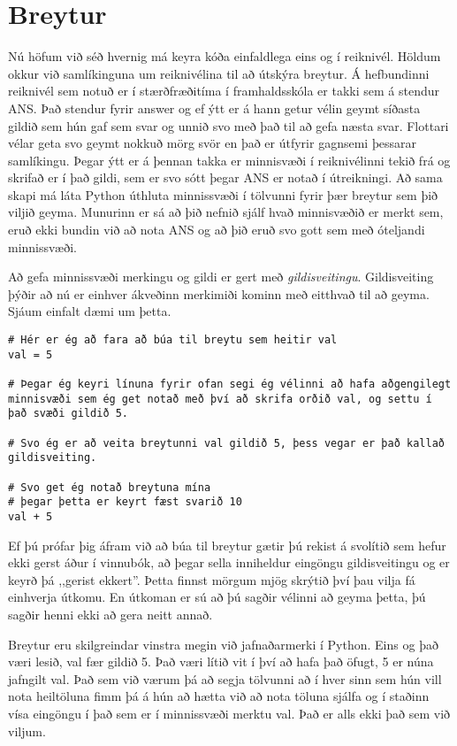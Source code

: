 \section{Breytur}
Nú höfum við séð hvernig má keyra kóða einfaldlega eins og í reiknivél.
Höldum okkur við samlíkinguna um reiknivélina til að útskýra breytur.
Á hefbundinni reiknivél sem notuð er í stærðfræðitíma í framhaldsskóla er takki sem á stendur ANS.
Það stendur fyrir answer og ef ýtt er á hann getur vélin geymt síðasta gildið sem hún gaf sem svar og unnið svo með það til að gefa næsta svar.
Flottari vélar geta svo geymt nokkuð mörg svör en það er útfyrir gagnsemi þessarar samlíkingu.
Þegar ýtt er á þennan takka er minnisvæði í reiknivélinni tekið frá og skrifað er í það gildi, sem er svo sótt þegar ANS er notað í útreikningi.
Að sama skapi má láta Python úthluta minnissvæði í tölvunni fyrir þær breytur sem þið viljið geyma.
Munurinn er sá að þið nefnið sjálf hvað minnisvæðið er merkt sem, eruð ekki bundin við að nota ANS og að þið eruð svo gott sem með óteljandi minnissvæði.

Að gefa minnissvæði merkingu og gildi er gert með \textit{gildisveitingu}.
Gildisveiting þýðir að nú er einhver ákveðinn merkimiði kominn með eitthvað til að geyma.
Sjáum einfalt dæmi um þetta.

\begin{lstlisting}[caption=Breytur kynntar]
# Hér er ég að fara að búa til breytu sem heitir val
val = 5

# Þegar ég keyri línuna fyrir ofan segi ég vélinni að hafa aðgengilegt minnisvæði sem ég get notað með því að skrifa orðið val, og settu í það svæði gildið 5.

# Svo ég er að veita breytunni val gildið 5, þess vegar er það kallað gildisveiting.

# Svo get ég notað breytuna mína
# þegar þetta er keyrt fæst svarið 10
val + 5
\end{lstlisting}

Ef þú prófar þig áfram við að búa til breytur gætir þú rekist á svolítið sem hefur ekki gerst áður í vinnubók, að þegar sella inniheldur eingöngu gildisveitingu og er keyrð þá ,,gerist ekkert''.
Þetta finnst mörgum mjög skrýtið því þau vilja fá einhverja útkomu.
En útkoman er sú að þú sagðir vélinni að geyma þetta, þú sagðir henni ekki að gera neitt annað.

Breytur eru skilgreindar vinstra megin við jafnaðarmerki í Python.
Eins og það væri lesið, val fær gildið 5.
Það væri lítið vit í því að hafa það öfugt, 5 er núna jafngilt val.
Það sem við værum þá að segja tölvunni að í hver sinn sem hún vill nota heiltöluna fimm þá á hún að hætta við að nota töluna sjálfa og í staðinn vísa eingöngu í það sem er í minnissvæði merktu val.
Það er alls ekki það sem við viljum.

